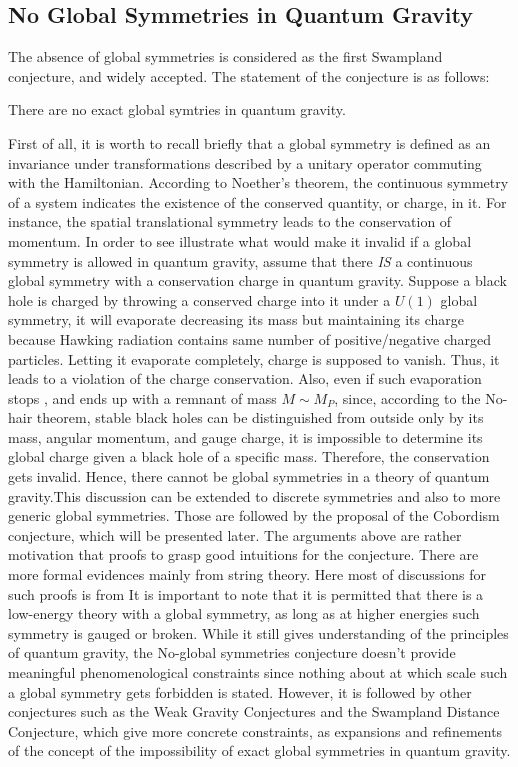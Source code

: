 \subsection{No Global Symmetries in Quantum Gravity}
The absence of global symmetries is considered as the first Swampland conjecture, and widely accepted. The statement of the conjecture is as follows:
\begin{tcolorbox}[title=No Global Symmetries Conjecture,
    title filled=false,
    colback=blue!5!white,
    colframe=blue!75!black]
    There are no exact global symtries in quantum gravity.  %
\end{tcolorbox} 
First of all, it is worth to recall briefly that a global symmetry is defined as an invariance under transformations described by a unitary operator commuting with the Hamiltonian. According to Noether's theorem, the continuous symmetry of a system indicates the existence of the conserved quantity, or charge, in it. For instance, the spatial translational symmetry leads to the conservation of momentum. In order to see illustrate what would make it invalid if a global symmetry is allowed in quantum gravity, assume that there \emph{IS} a continuous global symmetry with a conservation charge in quantum gravity. Suppose a black hole is charged by throwing a conserved charge into it under a $U(1)$ global symmetry, it will evaporate decreasing its mass but maintaining its charge because Hawking radiation contains same number of positive/negative charged particles. Letting it evaporate completely, charge is supposed to vanish. Thus, it leads to a violation of the charge conservation. Also, even if such evaporation stops , and ends up with a remnant of mass $M \sim M_{P}$, since, according to the No-hair theorem, stable black holes can be distinguished from outside only by its mass, angular momentum, and gauge charge, it is impossible to determine its global charge given a black hole of a specific mass. Therefore, the conservation gets invalid. Hence, there cannot be global symmetries in a theory of quantum gravity.This discussion can be extended to discrete symmetries and also to more generic global symmetries. Those are followed by the proposal of the Cobordism conjecture, which will be presented later. The arguments above are rather motivation that proofs to grasp good intuitions for the conjecture. There are more formal evidences mainly from string theory. Here most of discussions for such proofs is from %
It is important to note that it is permitted that there is a low-energy theory with a global symmetry, as long as at higher energies such symmetry is gauged or broken. While it still gives understanding of the principles of quantum gravity, the No-global symmetries conjecture doesn't provide meaningful phenomenological constraints since nothing about at which scale such a global symmetry gets forbidden is stated. However, it is followed by other conjectures such as the Weak Gravity Conjectures and the Swampland Distance Conjecture, which give more concrete constraints, as expansions and refinements of the concept of the impossibility of exact global symmetries in quantum gravity. 
